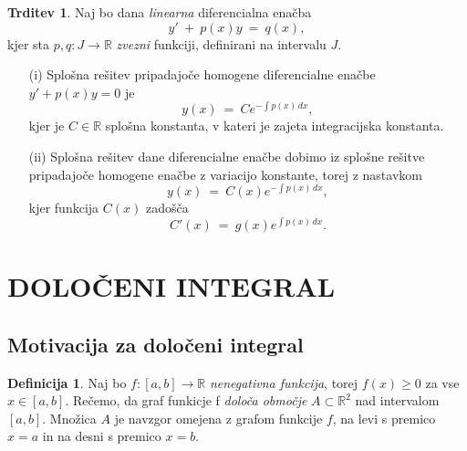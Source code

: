 \documentclass[11pt]{article}
\theoremstyle{definition}
\newtheorem{definicija}{Definicija}[section]
\theoremstyle{definition}
\newtheorem{trditev}{Trditev}[section]
\theoremstyle{definition}
\theoremstyle{theorem}
\begin{document}
\begin{trditev}

Naj bo dana \textit{linearna} diferencialna enačba 
$$y' ~+~ p(x) y ~=~ q(x),$$
kjer sta $p, q: J \rightarrow \mathbb{R}$ \textit{zvezni} funkciji, definirani na intervalu $J$.
\begin{enumerate}

	\item[(i)] Splošna rešitev pripadajoče homogene diferencialne enačbe \\ $y' + p(x) y = 0$ je
	$$y(x) ~=~ Ce^{-\int p(x)\,dx},$$
	kjer je $C \in \mathbb{R}$ splošna konstanta, v kateri je zajeta integracijska konstanta.
	
	\item[(ii)] Splošna rešitev dane diferencialne enačbe dobimo iz splošne rešitve pripadajoče homogene enačbe z variacijo konstante, torej z nastavkom
	$$y(x) ~=~ C(x)e^{-\int p(x)\,dx},$$
	kjer funkcija $C(x)$ zadošča
	$$C'(x) ~=~ g(x)e^{\int p(x)\,dx}.$$

\end{enumerate}

\end{trditev}
\vspace{0.5cm}


\pagebreak


\section{DOLOČENI INTEGRAL}
\vspace{0.5cm}


\subsection{Motivacija za določeni integral}
\vspace{0.5cm}

\begin{definicija}

Naj bo $f:[a, b] \rightarrow \mathbb{R}$ \textit{nenegativna funkcija}, torej $f(x) \geq 0$ za vse $x \in [a, b]$. Rečemo, da graf funkicje f \textit{določa območje} $A \subset \mathbb{R}^2$  nad intervalom $[a, b]$. Množica $A$ je navzgor omejena z grafom funkcije $f$, na levi s premico $x=a$ in na desni s premico $x=b$.

\end{definicija}
\vspace{0.5cm}
\end{document}
